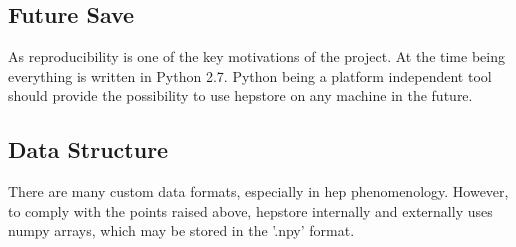 \subsection{Future Save}
As reproducibility is one of the key motivations of the project. At
the time being everything is written in Python 2.7. Python being a
platform independent tool should provide the possibility to use
hepstore on any machine in the future.

\subsection{Data Structure}
There are many custom data formats, especially in hep
phenomenology. However, to comply with the points raised above,
hepstore internally and externally uses numpy arrays, which may be
stored in the '.npy' format.
